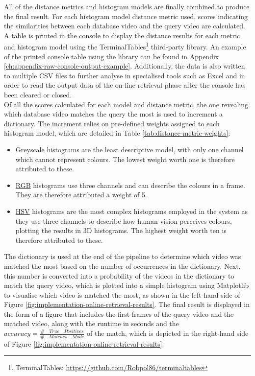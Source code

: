 All of the distance metrics and histogram models are finally combined to produce the final result. For each histogram model distance metric used, scores indicating the similarities between each database video and the query video are calculated. A table is printed in the console to display the distance results for each metric and histogram model using the TerminalTables\footnote{TerminalTables: \url{https://github.com/Robpol86/terminaltables}} third-party library. An example of the printed console table using the library can be found in Appendix \ref{ch:appendix-raw-console-output-example}. Additionally, the data is also written to multiple CSV files to further analyse in specialised tools such as Excel and in order to read the output data of the on-line retrieval phase after the console has been cleared or closed.\\

Of all the scores calculated for each model and distance metric, the one revealing which database video matches the query the most is used to increment a dictionary. The increment relies on pre-defined weights assigned to each histogram model, which are detailed in Table \ref{tab:distance-metric-weights}:

\begin{itemize}
    \item \underline{Greyscale} histograms are the least descriptive model, with only one channel which cannot represent colours. The lowest weight worth one is therefore attributed to these.
    \item \underline{RGB} histograms use three channels and can describe the colours in a frame. They are therefore attributed a weight of 5.
    \item \underline{HSV} histograms are the most complex histograms employed in the system as they use three channels to describe how human vision perceives colours, plotting the results in 3D histograms. The highest weight worth ten is therefore attributed to these.
\end{itemize}



The dictionary is used at the end of the pipeline to determine which video was matched the most based on the number of occurrences in the dictionary. Next, this number is converted into a probability of the videos in the dictionary to match the query video, which is plotted into a simple histogram using Matplotlib to visualise which video is matched the most, as shown in the left-hand side of Figure \ref{fig:implementation-online-retrieval-results}. The final result is displayed in the form of a figure that includes the first frames of the query video and the matched video, along with the runtime in seconds and the $accuracy = \frac{\# \quad True \quad Positives}{\# \quad Matches \quad Made}$ of the match, which is depicted in the right-hand side of Figure \ref{fig:implementation-online-retrieval-results}.\\

